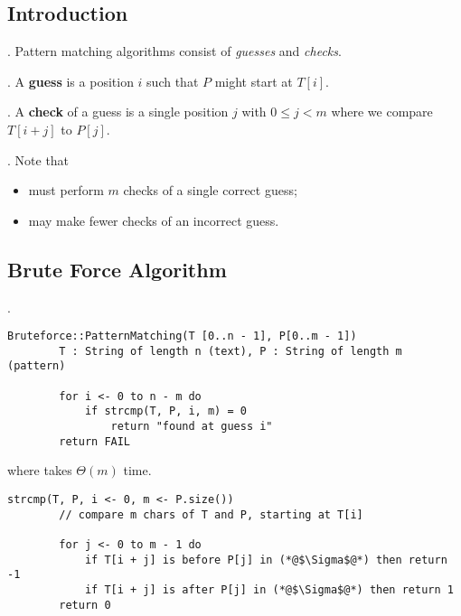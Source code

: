 \documentclass{article}
\begin{document}
\subsection{Introduction}

\begin{algo}[].
    Pattern matching algorithms consist of \textit{guesses} and \textit{checks}.  
\end{algo}

\begin{deff}.
    A \textbf{guess} is a position $i$ such that $P$ might start at $T[i]$. 
\end{deff}

\begin{deff}.
    A \textbf{check} of a guess is a single position $j$ with $0 \leq j < m$ where we compare $T[i + j]$ to $P[j]$. \begin{comm}[].
        Note that \begin{itemize}
            \item must perform $m$ checks of a single correct guess; 
            \item may make fewer checks of an incorrect guess. 
        \end{itemize}
    \end{comm}
\end{deff}

\subsection{Brute Force Algorithm} 

\begin{codes}[].
    \begin{lstlisting}[style=cppstyle]
        Bruteforce::PatternMatching(T [0..n - 1], P[0..m - 1])
        T : String of length n (text), P : String of length m (pattern)
        
        for i <- 0 to n - m do
            if strcmp(T, P, i, m) = 0
                return "found at guess i"
        return FAIL
    \end{lstlisting}
    where  takes $\Theta(m)$ time. 
    \begin{lstlisting}[style=cppstyle]
        strcmp(T, P, i <- 0, m <- P.size())
        // compare m chars of T and P, starting at T[i]
        
        for j <- 0 to m - 1 do
            if T[i + j] is before P[j] in (*@$\Sigma$@*) then return -1
            if T[i + j] is after P[j] in (*@$\Sigma$@*) then return 1
        return 0
    \end{lstlisting}
\end{codes}
\end{document}
